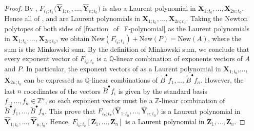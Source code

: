 \documentclass[10pt,a4paper]{amsart}
\numberwithin{equation}{section}
\begin{document}
\begin{proof}
 By \cite[Theorem 3.1]{BCDX2023}, $F_{i_{k};t_{k}}\bigl(\mathbf{\hat{Y}}_{1;t_{0}},\dots,\mathbf{\hat{Y}}_{n;t_{0}}\bigr)$ is also a Laurent polynomial in $\mathbf{X}_{1;t_{0}},\dots,\mathbf{X}_{2n;t_{0}}$. Hence all of ,  and  are Laurent polynomials in $\mathbf{X}_{1;t_{0}},\dots,\mathbf{X}_{2n;t_{0}}$. Taking the Newton polytopes of both sides of \eqref{fraction_of_F-polynomial} as the Laurent polynomials in $\mathbf{X}_{1;t_0},\dots, \mathbf{X}_{2n;t_0}$, we obtain
$\text{New}(F_{i_{k};t_{k}})+\text{New}(P)=\text{New}(A)$,
 where the sum is the Minkowski sum. By the definition of Minkowski sum, we conclude that every exponent vector of $F_{i_{k};t_{k}}$ is a $\mathbb{Q}$-linear combination of exponents vectors of $A$ and $P$.
 In particular, the exponent vectors of
  as a Laurent polynomial in $\mathbf{X}_{1;t_0}$,$\dots$, $\mathbf{X}_{2n;t_0}$ can be expressed as $\mathbb{Q}$-linear combinations of $\tilde{B}^{\bullet}f_{1},\dots,\tilde{B}^{\bullet}f_{n}$. However, the last $n$ coordinates of the vectors $\tilde{B}^{\bullet}f_{i}$ is given by the standard basis $f_1,\dots, f_{n}\in\mathbb{Z}^{n}$, so each exponent vector must be a $\mathbb{Z}$-linear combination of $\tilde{B}^{\bullet}f_{1},\dots,\tilde{B}^{\bullet}f_{n}$. This prove that $F_{i_{k};t_{k}}\bigl(\mathbf{\hat{Y}}_{1;t_{0}},\dots,\mathbf{\hat{Y}}_{n;t_{0}}\bigr)$ is a Laurent polynomial in $\mathbf{\hat{Y}}_{1;t_{0}},\dots,\mathbf{\hat{Y}}_{n;t_{0}}$. Hence, $F_{i_k;t_k}[\mathbf{Z}_1,\dots, \mathbf{Z}_n]$ is a Laurent polynomial in $\mathbf{Z}_{1},\dots,\mathbf{Z}_{n}$.


\end{proof}
\end{document}
